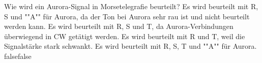     {Wie wird ein Aurora-Signal in Morsetelegrafie beurteilt?}
    {Es wird beurteilt mit R, S und ""A"" für Aurora, da der Ton bei Aurora sehr rau ist und nicht beurteilt werden kann.}
    {Es wird beurteilt mit R, S und T, da Aurora-Verbindungen überwiegend in CW getätigt werden.}
    {Es wird beurteilt mit R und T, weil die Signalstärke stark schwankt.}
    {Es wird beurteilt mit R, S, T und ""A"" für Aurora.}
    {false}{false}